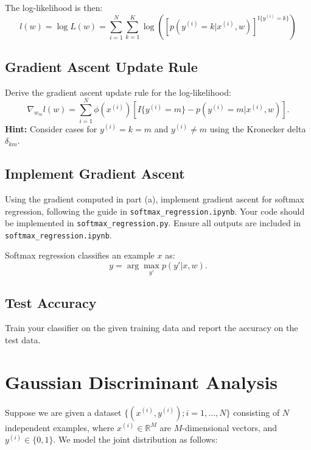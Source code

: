 \documentclass[lang=cn,11pt]{elegantbook}
\begin{document}
The log-likelihood is then:
\begin{equation}
    l(w) = \log L(w) = \sum_{i=1}^{N} \sum_{k=1}^{K} \log \left( \left[ p(y^{(i)} = k|x^{(i)},w) \right]^{\mathbb{I}\{y^{(i)}=k\}} \right)
\end{equation}

\subsection{Gradient Ascent Update Rule}

Derive the gradient ascent update rule for the log-likelihood:
\begin{equation}
    \nabla_{w_m} l(w) = \sum_{i=1}^{N} \phi(x^{(i)}) \left[I\{y^{(i)} = m\} - p(y^{(i)} = m | x^{(i)}, w)\right].
\end{equation}
\textbf{Hint:} Consider cases for $y^{(i)} = k = m$ and $y^{(i)} \neq m$ using the Kronecker delta $\delta_{km}$.

\subsection{Implement Gradient Ascent}

Using the gradient computed in part (a), implement gradient ascent for softmax regression, following the guide in \texttt{softmax\_regression.ipynb}. Your code should be implemented in \texttt{softmax\_regression.py}. Ensure all outputs are included in \texttt{softmax\_regression.ipynb}.

Softmax regression classifies an example $x$ as:
\begin{equation}
    y = \arg\max_{y'} p(y'|x,w).
\end{equation}

\subsection{Test Accuracy}

Train your classifier on the given training data and report the accuracy on the test data.



\section{Gaussian Discriminant Analysis}

Suppose we are given a dataset $\{(x^{(i)}, y^{(i)}); i = 1, ..., N\}$ consisting of $N$ independent examples, where $x^{(i)} \in \mathbb{R}^M$ are $M$-dimensional vectors, and $y^{(i)} \in \{0, 1\}$. We model the joint distribution as follows:
\end{document}
